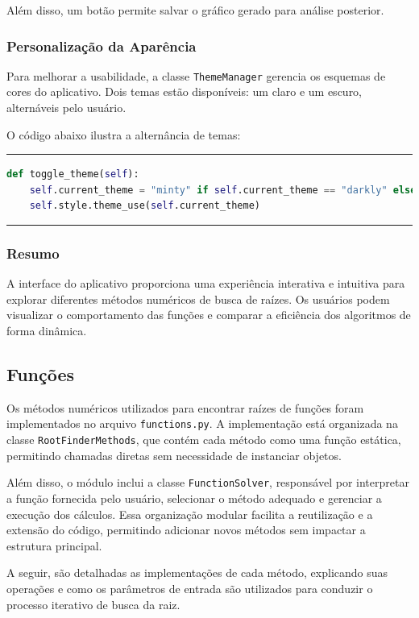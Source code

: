 Além disso, um botão permite salvar o gráfico gerado para análise posterior.

\subsubsection{Personalização da Aparência}

Para melhorar a usabilidade, a classe \texttt{ThemeManager} gerencia os esquemas
de cores do aplicativo. Dois temas estão disponíveis: um claro e um escuro,
alternáveis pelo usuário.

O código abaixo ilustra a alternância de temas:

\hrule
\lstset{style=mystyle}
\begin{lstlisting}[language=Python]
def toggle_theme(self):
    self.current_theme = "minty" if self.current_theme == "darkly" else "darkly"
    self.style.theme_use(self.current_theme)
\end{lstlisting}
\hrule

\subsubsection{Resumo}

A interface do aplicativo proporciona uma experiência interativa e intuitiva
para explorar diferentes métodos numéricos de busca de raízes. Os usuários podem
visualizar o comportamento das funções e comparar a eficiência dos algoritmos de
forma dinâmica.

\subsection{Funções}

Os métodos numéricos utilizados para encontrar raízes de funções foram
implementados no arquivo \texttt{functions.py}. A implementação está organizada
na classe \texttt{RootFinderMethods}, que contém cada método como uma função
estática, permitindo chamadas diretas sem necessidade de instanciar objetos.

Além disso, o módulo inclui a classe \texttt{FunctionSolver}, responsável por
interpretar a função fornecida pelo usuário, selecionar o método adequado e
gerenciar a execução dos cálculos. Essa organização modular facilita a
reutilização e a extensão do código, permitindo adicionar novos métodos sem
impactar a estrutura principal.

A seguir, são detalhadas as implementações de cada método, explicando suas
operações e como os parâmetros de entrada são utilizados para conduzir o
processo iterativo de busca da raiz.

